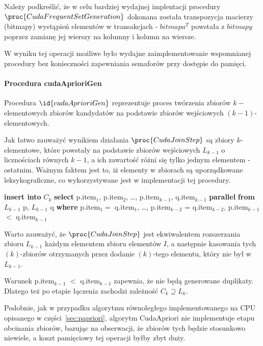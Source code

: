Należy podkreślić, że w celu bardziej wydajnej implentacji procedury $\proc{Cuda Frequent Set Generation}$ dokonana została transpozycja macierzy (bitmapy) wystąpień elementów w transakcjach - $bitmapa^T$ powstała z $bitmapy$ poprzez zamianę jej wierszy na kolumny i kolumn na wiersze. 

W wyniku tej operacji możliwe było wydajne zaimplementowanie wspomnianej procedury bez konieczności zapewniania semaforów przy dostępie do pamięci.


\paragraph{Procedura cudaAprioriGen\label{sec:cudaAprioriGen}}
Procedura $\id{cudaAprioriGen}$ reprezentuje proces twórzenia zbiorów $k-$ elementowych zbiorów kandydatów na podstawie zbiorów wejściowych $(k-1)$-elementowych.

Jak łatwo zauważyć wynikiem działania $\proc{Cuda Join Step}$ są zbiory $k$-elementowe, które powstały na podstawie zbiorów wejściowych $L_{k-1}$ o licznościach równych $k-1$, a ich zawartość różni się tylko jednym elementem - ostatnim. Ważnym faktem jest to, iż elementy w zbiorach są uporządkowane leksykograficzne, co wykorzystywane jest w implementacji tej procedury.

\begin{codebox}
	\li \textbf{insert into} $C_k$
	\li \textbf{select} p.item$_1$, p.item$_2$, \dots, p.item$_{k-1}$, q.item$_{k-1}$ \textbf{parallel}
	\li \textbf{from} $L_{k-1}$ p, $L_{k-1}$ q
	\li \textbf{where} p.item$_1 = $ q.item$_1$, \dots, p.item$_{k-2}$ = q.item$_{k-2}$, p.item$_{k-1}$ $<$ q.item$_{k-1}$
\end{codebox}

Warto zauważyć, że $\proc{Cuda Join Step}$ jest ekwiwalentem rozszerzania zbioru $L_{k-1}$ każdym elementem zbioru elementów $I$, a następnie kasowania tych $(k)$-zbiorów otrzymanych przez dodanie $(k)$-tego elementu, który nie był w $L_{k-1}$. 

Warunek p.item$_{k-1}$ $<$ q.item$_{k-1}$ zapewnia, że nie będą generowane duplikaty. Dlatego też po etapie łączenia zachodzi zależność $C_k \supseteq L_k$.

Podobnie, jak w przypadku algorytmu równoległego implementowanego na CPU opisanego w części~\ref{sec:papriori}, algorytm CudaApriori nie implementuje etapu obcinania zbiorów, bazując na obserwacji, że zbiorów tych będzie stosunkowo niewiele, a koszt pamięciowy tej operacji byłby zbyt duży.

